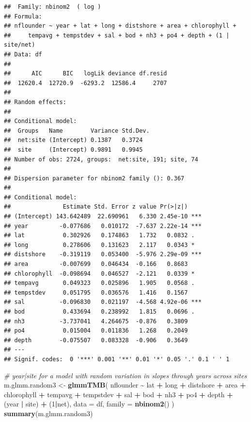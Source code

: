 \documentclass[
]{article}
\newenvironment{Shaded}{\begin{snugshade}}{\end{snugshade}}
\newcommand{\AttributeTok}[1]{\textcolor[rgb]{0.13,0.29,0.53}{#1}}
\newcommand{\CommentTok}[1]{\textcolor[rgb]{0.56,0.35,0.01}{\textit{#1}}}
\newcommand{\DecValTok}[1]{\textcolor[rgb]{0.00,0.00,0.81}{#1}}
\newcommand{\FunctionTok}[1]{\textcolor[rgb]{0.13,0.29,0.53}{\textbf{#1}}}
\newcommand{\NormalTok}[1]{#1}
\newcommand{\OtherTok}[1]{\textcolor[rgb]{0.56,0.35,0.01}{#1}}
\newcommand{\SpecialCharTok}[1]{\textcolor[rgb]{0.81,0.36,0.00}{\textbf{#1}}}
\begin{document}
\begin{verbatim}
##  Family: nbinom2  ( log )
## Formula:          
## nflounder ~ year + lat + long + distshore + area + chlorophyll +  
##     tempavg + tempstdev + sal + bod + nh3 + po4 + depth + (1 |      site/net)
## Data: df
## 
##      AIC      BIC   logLik deviance df.resid 
##  12620.4  12720.9  -6293.2  12586.4     2707 
## 
## Random effects:
## 
## Conditional model:
##  Groups   Name        Variance Std.Dev.
##  net:site (Intercept) 0.1387   0.3724  
##  site     (Intercept) 0.9891   0.9945  
## Number of obs: 2724, groups:  net:site, 191; site, 74
## 
## Dispersion parameter for nbinom2 family (): 0.367 
## 
## Conditional model:
##               Estimate Std. Error z value Pr(>|z|)    
## (Intercept) 143.642489  22.690961   6.330 2.45e-10 ***
## year         -0.077686   0.010172  -7.637 2.22e-14 ***
## lat           0.302926   0.174863   1.732   0.0832 .  
## long          0.278606   0.131623   2.117   0.0343 *  
## distshore    -0.319119   0.053400  -5.976 2.29e-09 ***
## area         -0.007699   0.046434  -0.166   0.8683    
## chlorophyll  -0.098694   0.046527  -2.121   0.0339 *  
## tempavg       0.049323   0.025896   1.905   0.0568 .  
## tempstdev     0.051795   0.036576   1.416   0.1567    
## sal          -0.096830   0.021197  -4.568 4.92e-06 ***
## bod           0.433694   0.238992   1.815   0.0696 .  
## nh3          -3.737041   4.264675  -0.876   0.3809    
## po4           0.015004   0.011836   1.268   0.2049    
## depth        -0.075507   0.083328  -0.906   0.3649    
## ---
## Signif. codes:  0 '***' 0.001 '**' 0.01 '*' 0.05 '.' 0.1 ' ' 1
\end{verbatim}

\begin{Shaded}
\begin{Highlighting}[]
\CommentTok{\# year|site for a model with random variation in slopes through years across sites}
\NormalTok{m.glmm.random3 }\OtherTok{\textless{}{-}} \FunctionTok{glmmTMB}\NormalTok{(}
\NormalTok{    nflounder }\SpecialCharTok{\textasciitilde{}}\NormalTok{ lat }\SpecialCharTok{+}\NormalTok{ long }\SpecialCharTok{+}\NormalTok{ distshore }\SpecialCharTok{+}\NormalTok{ area }\SpecialCharTok{+}\NormalTok{ chlorophyll }\SpecialCharTok{+}\NormalTok{ tempavg }\SpecialCharTok{+}\NormalTok{ tempstdev }\SpecialCharTok{+}\NormalTok{ sal }\SpecialCharTok{+}\NormalTok{ bod }\SpecialCharTok{+}\NormalTok{ nh3 }\SpecialCharTok{+}\NormalTok{ po4 }\SpecialCharTok{+}\NormalTok{ depth }\SpecialCharTok{+}\NormalTok{ (year }\SpecialCharTok{|}\NormalTok{ site) }\SpecialCharTok{+}\NormalTok{ (}\DecValTok{1}\SpecialCharTok{|}\NormalTok{net), }
    \AttributeTok{data =}\NormalTok{ df, }
    \AttributeTok{family =} \FunctionTok{nbinom2}\NormalTok{()}
\NormalTok{)}
\FunctionTok{summary}\NormalTok{(m.glmm.random3)}
\end{Highlighting}
\end{Shaded}
\end{document}
